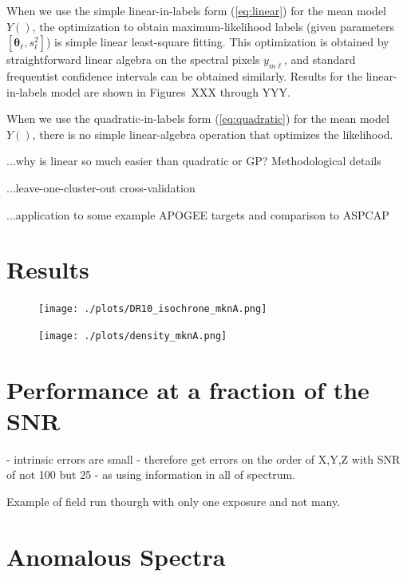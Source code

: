 \documentclass[12pt, preprint]{aastex}
\newcommand{\set}[1]{\bm{#1}}
\begin{document}
When we use the simple linear-in-labels form (\ref{eq:linear}) for the
mean model $Y()$, the optimization to obtain maximum-likelihood labels
(given parameters $[\set{\theta}_\ell, s_\ell^2]$) is simple linear
least-square fitting.
This optimization is obtained by straightforward linear algebra on the
spectral pixels $y_{m\ell}$, and standard frequentist confidence
intervals can be obtained similarly.
Results for the linear-in-labels model are shown in Figures~XXX through
YYY.

When we use the quadratic-in-labels form (\ref{eq:quadratic}) for the
mean model $Y()$, there is no simple linear-algebra operation that
optimizes the likelihood.



...why is linear so much easier than quadratic or GP?  Methodological details

...leave-one-cluster-out cross-validation

...application to some example APOGEE targets and comparison to ASPCAP




\section{Results}

\begin{figure}[h!]
  \texttt{[image: ./plots/DR10\_isochrone\_mknA.png]}
\caption{\small{}}
\label{fig:cal}
\end{figure}

\begin{figure}[h!]
  \texttt{[image: ./plots/density\_mknA.png]}
\caption{\small{}}
\label{fig:cal}
\end{figure}


\section{Performance at a fraction of the SNR} 

- intrinsic errors are small 
- therefore get errors on the order of X,Y,Z with SNR of not 100 but 25 - as using information in all of spectrum. 

Example of field run thourgh with only one exposure and not many. 



\section{Anomalous Spectra}
\end{document}
